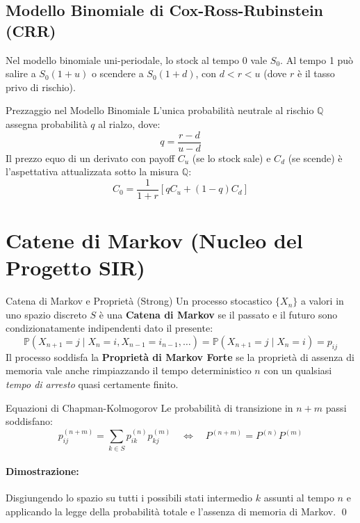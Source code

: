 \documentclass[11pt,a4paper]{article}
\begin{document}
\subsection{Modello Binomiale di Cox-Ross-Rubinstein (CRR)}
Nel modello binomiale uni-periodale, lo stock al tempo 0 vale $S_0$. Al tempo 1 può salire a $S_0(1+u)$ o scendere a $S_0(1+d)$, con $d < r < u$ (dove $r$ è il tasso privo di rischio). 
\begin{teorema}{Prezzaggio nel Modello Binomiale}{}
L'unica probabilità neutrale al rischio $\mathbb{Q}$ assegna probabilità $q$ al rialzo, dove:
\[ q = \frac{r - d}{u - d} \]
Il prezzo equo di un derivato con payoff $C_u$ (se lo stock sale) e $C_d$ (se scende) è l'aspettativa attualizzata sotto la misura $\mathbb{Q}$:
\[ C_0 = \frac{1}{1+r} [ q C_u + (1-q) C_d ] \]
\end{teorema}

\newpage
\section{Catene di Markov (Nucleo del Progetto SIR)}

\begin{definizione}{Catena di Markov e Proprietà (Strong)}{}
Un processo stocastico $\{X_n\}$ a valori in uno spazio discreto $S$ è una \textbf{Catena di Markov} se il passato e il futuro sono condizionatamente indipendenti dato il presente:
\[ \mathbb{P}(X_{n+1} = j \mid X_n = i, X_{n-1} = i_{n-1}, \dots) = \mathbb{P}(X_{n+1} = j \mid X_n = i) = p_{ij} \]
Il processo soddisfa la \textbf{Proprietà di Markov Forte} se la proprietà di assenza di memoria vale anche rimpiazzando il tempo deterministico $n$ con un qualsiasi \textit{tempo di arresto} quasi certamente finito.
\end{definizione}

\begin{teorema}{Equazioni di Chapman-Kolmogorov}{}
Le probabilità di transizione in $n+m$ passi soddisfano:
\[ p_{ij}^{(n+m)} = \sum_{k \in S} p_{ik}^{(n)} p_{kj}^{(m)} \quad \iff \quad P^{(n+m)} = P^{(n)} P^{(m)} \]
\end{teorema}
\paragraph{Dimostrazione:} Disgiungendo lo spazio su tutti i possibili stati intermedio $k$ assunti al tempo $n$ e applicando la legge della probabilità totale e l'assenza di memoria di Markov. \qed
\end{document}
